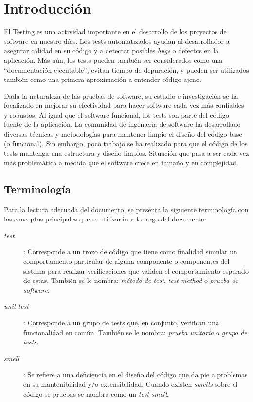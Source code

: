 \chapter{Introducción} 
\par El Testing es una actividad importante en el desarrollo de los proyectos de software en nuestro días. Los tests automatizados ayudan al desarrollador a asegurar calidad en su código y a detectar posibles \emph{bugs} o defectos en la aplicación. Más aún, los tests pueden también ser considerados como  una ``documentación ejecutable'', evitan tiempo de depuración, y pueden ser utilizados también como una primera aproximación a entender código ajeno.

\par Dada la naturaleza de las pruebas de software, su estudio e investigación se ha focalizado en mejorar su efectividad para hacer software cada vez más confiables y robustos. Al igual que el software funcional, los tests son parte del código fuente de la aplicación. La comunidad de ingeniería de software ha desarrollado diversas técnicas y metodologías para mantener limpio el diseño del código base (o funcional). Sin embargo, poco trabajo se ha realizado para que  el código de los tests mantenga una estructura y diseño limpios. Situación que pasa a ser cada vez más problemática a medida que el software crece en tamaño y en complejidad.


\section{Terminología}

\par Para la lectura adecuada del documento, se presenta la siguiente terminología con los conceptos principales que se utilizarán a lo largo del documento:

\begin{description}
\item[\emph{test}]: Corresponde a un trozo de código que tiene como finalidad simular un comportamiento particular de alguna componente o componentes del sistema para realizar verificaciones que validen el comportamiento esperado de estas. También se le nombra: \emph{método de test}, \emph{test method} o \emph{prueba de software}.
\item[\emph{unit test}]: Corresponde a un grupo de tests que, en conjunto, verifican una funcionalidad en común. También se le nombra: \emph{prueba unitaria} o \emph{grupo de tests}.
\item[\emph{smell}]: Se refiere a una deficiencia en el diseño del código que da pie a problemas en su mantenibilidad y/o extensibilidad. Cuando existen \emph{smells} sobre el código se pruebas se nombra como un \emph{test smell}.
\end{description}

